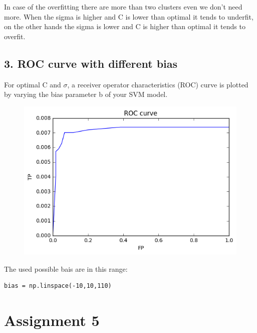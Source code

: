 \documentclass[a4paper,11pt]{article}
\begin{document}
In case of the overfitting there are more than two clusters even we don't need more.
When the sigma is higher and C is lower than optimal it tends to underfit, on the other hands the sigma is lower and C is higher than optimal it tends to overfit.

\subsection*{3. ROC curve with different bias}

For optimal C and $\sigma$, a receiver operator characteristics (ROC) curve is plotted by varying the bias
parameter b of your SVM model. 

\begin{figure}[htbp]
  \includegraphics[scale=0.5]{roc.png}
\end{figure}

The used possible bais are in this range:

\begin{verbatim}
bias = np.linspace(-10,10,110)
\end{verbatim}


\section*{Assignment 5}

\begin{verbatim}


























\end{verbatim}
\end{document}
